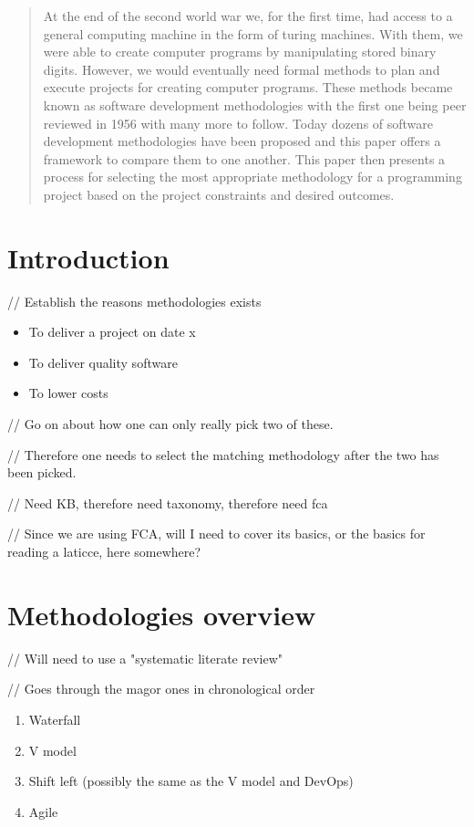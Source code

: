 \begin{abstract}
  At the end of the second world war we, for the first time, had access to a general computing machine in the form of turing machines.
  With them, we were able to create computer programs by manipulating stored binary digits.
  However, we would eventually need formal methods to plan and execute projects for creating computer programs.
  These methods became known as software development methodologies with the first one being peer reviewed in 1956 with many more to follow.
  Today dozens of software development methodologies have been proposed and this paper offers a framework to compare them to one another.
  This paper then presents a process for selecting the most appropriate methodology for a programming project based on the project constraints and desired outcomes.
\end{abstract}

\section{Introduction}
// Establish the reasons methodologies exists
\cite{einstein}

\begin{itemize}
    \item To deliver a project on date x
    \item To deliver quality software
    \item To lower costs
\end{itemize}

// Go on about how one can only really pick two of these.

// Therefore one needs to select the matching methodology after the two has been picked.

// Need KB, therefore need taxonomy, therefore need fca

// Since we are using FCA, will I need to cover its basics, or the basics for reading a laticce, here somewhere?

\section{Methodologies overview}
// Will need to use a "systematic literate review"

// Goes through the magor ones in chronological order

\begin{enumerate}
  \item Waterfall
  \item V model
  \item Shift left (possibly the same as the V model and DevOps)
  \item Agile
\end{enumerate}

